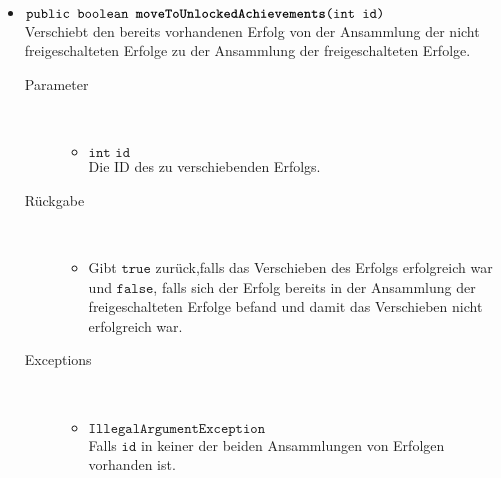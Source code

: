 \begin{description}
\begin{itemize}
			\item $\texttt{public boolean \textbf{moveToUnlockedAchievements}(int id)}$ \\ Verschiebt den bereits vorhandenen Erfolg von der Ansammlung der nicht freigeschalteten Erfolge zu der Ansammlung der freigeschalteten Erfolge.
				\begin{description}
					\item[Parameter] \hfill \\
					\vspace{-.8cm}
					\begin{itemize}
						\item $\texttt{int id}$ \\ Die ID des zu verschiebenden Erfolgs.
					\end{itemize}
					\item[Rückgabe] \hfill \\
					\vspace{-.8cm}
					\begin{itemize}
						\item Gibt $\texttt{true}$ zurück,falls das Verschieben des Erfolgs erfolgreich war und $\texttt{false}$, falls sich der Erfolg bereits in der Ansammlung der freigeschalteten Erfolge befand und damit das Verschieben nicht erfolgreich war.
					\end{itemize}
					\item[Exceptions] \hfill \\
					\vspace{-.8cm}
					\begin{itemize}
						\item $\texttt{IllegalArgumentException}$ \\ Falls $\texttt{id}$ in keiner der beiden Ansammlungen von Erfolgen vorhanden ist.
					\end{itemize}
				\end{description}	
		

\end{itemize}
\end{description}
